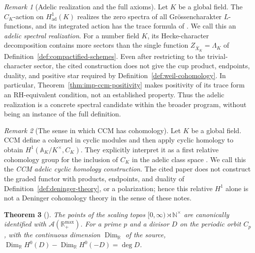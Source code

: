\documentclass[11pt]{amsart}
\theoremstyle{plain}
\newtheorem{theorem}{Theorem}[section]
\theoremstyle{definition}
\theoremstyle{remark}
\newtheorem{remark}[theorem]{Remark}
\numberwithin{equation}{section}
\newcommand{\R}{\mathbb{R}}
\newcommand{\N}{\mathbb{N}}
\newcommand{\Xbar}{\overline{X}}
\begin{document}
\begin{remark}[Adelic realization and the full axioms]
\label{rem:ccm-deninger-scope}
Let $K$ be a global field. The $C_K$-action on
$H^1_{\mathrm{ad}}(K)$ realizes the zero spectra of all
Gr\"ossencharakter $L$-functions, and its integrated action has the
trace formula of \cite[Proposition~4.13 and Theorem~4.16, pp.~23--24]%
{ConnesConsaniMarcolli2009Weil}. We call this an \emph{adelic
spectral realization}. For a number field $K$, its Hecke-character
decomposition \cite[Proposition~4.12, p.~23]%
{ConnesConsaniMarcolli2009Weil} contains more sectors than the single
function $Z_{\Xbar_K}=\Lambda_K$ of
Definition~\ref{def:compactified-schemes}. Even after
restricting to the trivial-character sector, the cited construction
does not give the cup product, endpoints, duality, and positive star
required by Definition~\ref{def:weil-cohomology}. In particular,
Theorem~\ref{thm:imp-ccm-positivity} makes positivity of its trace
form an RH-equivalent condition, not an established property. Thus
the adelic realization is a concrete spectral candidate within the
broader program, without being an instance of the full definition.
\end{remark}

\begin{remark}[The sense in which CCM has cohomology]
\label{rem:ccm-relative-cohomology}
Let $K$ be a global field. CCM define a cokernel in cyclic modules
and then apply cyclic homology to obtain
$H^1(\mathbb A_K/K^\times,C_K)$. They explicitly interpret it as a
first relative cohomology group for the inclusion of $C_K$ in the
adelic class space \cite[Definition~4.10 and (4.28), pp.~21--22]%
{ConnesConsaniMarcolli2009Weil}. We call this the \emph{CCM adelic
cyclic homology construction}. The cited paper does not construct
the graded functor with products, endpoints, and duality of
Definition~\ref{def:deninger-theory}, or a polarization; hence this
relative $H^1$
alone is not a Deninger cohomology theory in the sense of these notes.
\end{remark}

\begin{theorem}[{\cite[Theorems~3.9, p.~14, and~5.17, p.~32]%
{ConnesConsani2017ScalingGeometry}}]\label{thm:imp-cc16}
The points of the scaling topos $[0,\infty)\rtimes\N^\times$ are
canonically identified with $\mathcal A(\R_+^{\max})$. For a prime $p$
and a divisor $D$ on the periodic orbit $C_p$, with the continuous
dimension $\operatorname{Dim}_\R$ of the source,
$\operatorname{Dim}_\R H^0(D)-\operatorname{Dim}_\R H^0(-D)=\deg D$.
\end{theorem}
\end{document}
